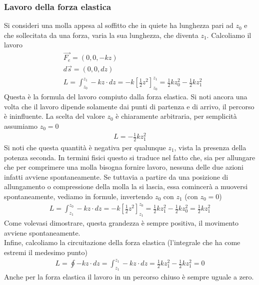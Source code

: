 \documentclass[10pt,a4paper]{article}
\begin{document}
\subsubsection{Lavoro della forza elastica}
Si consideri una molla appesa al soffitto che in quiete ha lunghezza pari ad $z_0$ e che sollecitata da una forza, varia la sua lunghezza, che diventa $z_1$. Calcoliamo il lavoro
\begin{align*}
	&\vec{F_e}=(0,0,-kz)\\
	&d\vec{s} = (0,0,dz)\\
	&L = \int_{z_0}^{z_1} -kz \cdot dz = -k[\frac{1}{2}z^2]_{z_0}^{z_1} = \frac{1}{2}kz_0^2-\frac{1}{2}kz_1^2
\end{align*} 
Questa è la formula del lavoro compiuto dalla forza elastica. Si noti ancora una volta che il lavoro dipende solamente dai punti di partenza e di arrivo, il percorso è ininfluente. La scelta del valore $z_0$ è chiaramente arbitraria, per semplicità assumiamo $z_0 = 0$
\begin{align*}
	L = -\frac{1}{2}kz_1^2
\end{align*} 
Si noti che questa quantità è negativa per qualunque $z_1$, vista la presenza della potenza seconda. In termini fisici questo si traduce nel fatto che, sia per allungare che per comprimere una molla bisogna fornire lavoro, nessuna delle due azioni infatti avviene spontaneamente. Se tuttavia a partire da una posizione di allungamento o compressione della molla la si lascia, essa comincerà a muoversi spontaneamente, vediamo in formule, invertendo $z_0$ con $z_1$ (con $z_0=0$)
\begin{align*}
		L = \int_{z_1}^{z_0} -kz \cdot dz = -k[\frac{1}{2}z^2]_{z_1}^{z_0} = \frac{1}{2}kz_1^2-\frac{1}{2}kz_0^2=\frac{1}{2}kz_1^2
\end{align*}
Come volevasi dimostrare, questa grandezza è sempre positiva, il movimento avviene spontaneamente.\\
Infine, calcoliamo la circuitazione della forza elastica (l'integrale che ha come estremi il medesimo punto)
\begin{align*}
	L = \oint-kz \cdot dz = \int_{z_1}^{z_1} -kz \cdot dz = \frac{1}{2}kz_1^2-\frac{1}{2}kz_1^2= 0
\end{align*}
Anche per la forza elastica il lavoro in un percorso chiuso è sempre uguale a zero.
\end{document}
